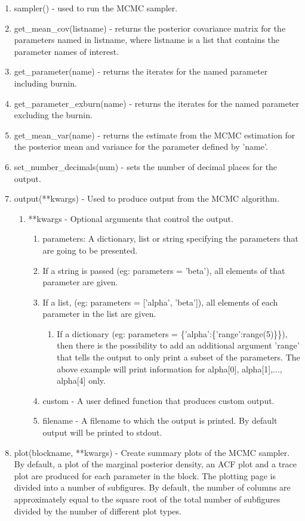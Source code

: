 \documentclass[article]{jss}
\begin{document}
\begin{enumerate}
\item sampler() - used to run the MCMC sampler. 
\item get\_mean\_cov(listname) - returns the posterior covariance matrix
  for the parameters named in listname, where listname is a list that
  contains the parameter names of interest. 
\item get\_parameter(name) - returns the iterates for the named parameter
  including burnin.
\item get\_parameter\_exburn(name) - returns the iterates for the named
  parameter excluding the burnin.
\item get\_mean\_var(name) - returns the estimate from the MCMC estimation
  for the posterior mean and variance for the parameter defined by 'name'. 
\item set\_number\_decimals(num) - sets the number of decimal places for
  the output. 
\item output({*}{*}kwargs) - Used to produce output from the MCMC algorithm.
  
  \begin{enumerate}
  \item {*}{*}kwargs - Optional arguments that control the output.
    
    \begin{enumerate}
    \item parameters: A dictionary, list or string specifying the parameters
      that are going to be presented. 
    \item If a string is passed (eg: parameters = 'beta'), all elements of that
      parameter are given.
    \item If a list, (eg: parameters = {[}'alpha', 'beta'{]}), all elements
      of each parameter in the list are given.
      
\begin{enumerate}
\item If a dictionary (eg: parameters = \{'alpha':\{'range':range(5)\}\}),
  then there is the possibility to add an additional argument 'range'
  that tells the output to only print a subset of the parameters. The
  above example will print information for alpha{[}0{]}, alpha{[}1{]},...,
  alpha{[}4{]} only.
\end{enumerate}
\item custom - A user defined function that produces custom output. 
\item filename - A filename to which the output is printed. By default
  output will be printed to stdout.
\end{enumerate}
\end{enumerate}
\item plot(blockname, {*}{*}kwargs) - Create summary plots of the MCMC
  sampler.  By default, a plot of the marginal posterior density, an
  ACF plot and a trace plot are produced for each parameter in the
  block. The plotting page is divided into a number of subfigures. By
  default, the number of columns are approximately equal to the square
  root of the total number of subfigures divided by the number of
  different plot types.


\end{enumerate}
\end{document}
